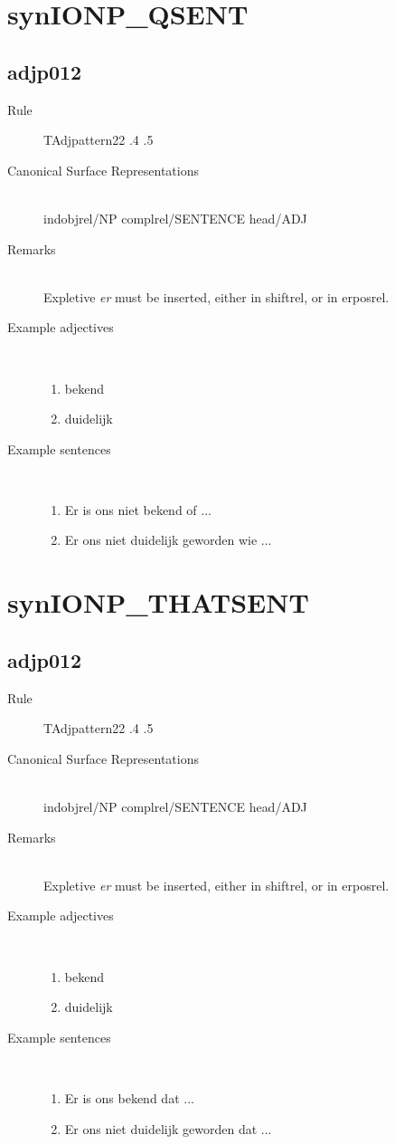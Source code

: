 \section{synIONP\_QSENT}
  \subsection{adjp012}
\begin{description}
  \item [Rule] TAdjpattern22 .4 .5
  \item [Canonical Surface Representations] \mbox{}\\
indobjrel/NP complrel/SENTENCE head/ADJ
  \item [Remarks] \mbox{}\\
Expletive {\em er} must be inserted, either in shiftrel, or in erposrel.
  \item [Example adjectives]\mbox{}\\
\begin{enumerate}
  \item bekend
  \item duidelijk
\end{enumerate}
  \item [Example sentences]\mbox{}\\
\begin{enumerate}
  \item Er is ons niet bekend of ...
  \item Er ons niet duidelijk geworden wie ...
\end{enumerate}
\end{description}
\newpage
\section{synIONP\_THATSENT}
  \subsection{adjp012}
\begin{description}
  \item [Rule] TAdjpattern22 .4 .5
  \item [Canonical Surface Representations] \mbox{}\\
indobjrel/NP complrel/SENTENCE head/ADJ
  \item [Remarks] \mbox{}\\
Expletive {\em er} must be inserted, either in shiftrel, or in erposrel.
  \item [Example adjectives]\mbox{}\\
\begin{enumerate}
  \item bekend
  \item duidelijk
\end{enumerate}
  \item [Example sentences]\mbox{}\\
\begin{enumerate}
  \item Er is ons bekend dat ...
  \item Er ons niet duidelijk geworden dat ...
\end{enumerate}

\end{description}
\newpage
